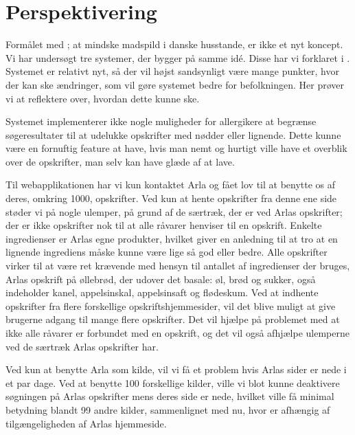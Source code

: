 \section{Perspektivering}
\label{sec:perspektivering}
Formålet med \Foodl{}; at mindske madspild i danske husstande, er ikke et nyt koncept. Vi har undersøgt tre systemer, der bygger på samme idé. Disse har vi forklaret i . Systemet er relativt nyt, så der vil højst sandsynligt være mange punkter, hvor der kan ske ændringer, som vil gøre systemet bedre for befolkningen. Her prøver vi at reflektere over, hvordan dette kunne ske.

Systemet \Foodl{} implementerer ikke nogle muligheder for \fx allergikere at begrænse søgeresultater til \fx at udelukke opskrifter med nødder eller lignende. Dette kunne være en fornuftig feature at have, hvis man nemt og hurtigt ville have et overblik over de opskrifter, man selv kan have glæde af at lave.

Til webapplikationen \Foodl{} har vi kun kontaktet Arla og fået lov til at benytte os af deres, omkring 1000, opskrifter. Ved kun at hente opskrifter fra denne ene side støder vi på nogle ulemper, på grund af de særtræk, der er ved Arlas opskrifter; der er ikke opskrifter nok til at alle råvarer henviser til en opskrift. Enkelte ingredienser er Arlas egne produkter, hvilket giver en anledning til at tro at en lignende ingrediens måske kunne være lige så god eller bedre. Alle opskrifter virker til at være ret krævende med hensyn til antallet af ingredienser der bruges, \fx Arlas opskrift på øllebrød, der udover det basale: øl, brød og sukker, også indeholder kanel, appelsinskal, appelsinsaft og flødeskum. Ved at indhente opskrifter fra flere forskellige opskriftshjemmesider, vil det blive muligt at give brugerne adgang til mange flere opskrifter. Det vil hjælpe på problemet med at ikke alle råvarer er forbundet med en opskrift, og det vil også afhjælpe ulemperne ved de særtræk Arlas opskrifter har. 

Ved kun at benytte Arla som kilde, vil vi få et problem hvis Arlas sider er nede i et par dage. Ved at benytte 100 forskellige kilder, ville vi blot kunne deaktivere søgningen på Arlas opskrifter mens deres side er nede, hvilket ville få minimal betydning blandt 99 andre kilder, sammenlignet med nu, hvor \Foodl{} er afhængig af tilgængeligheden af Arlas hjemmeside.

